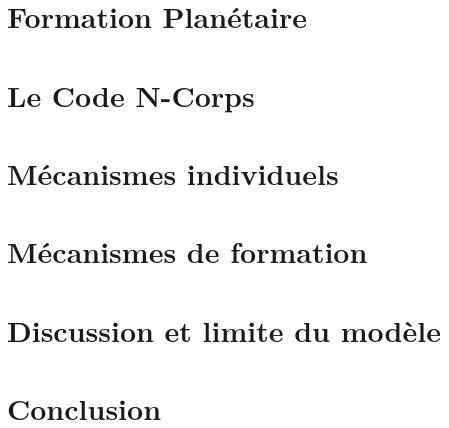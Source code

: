 \documentclass[logos,chaptertoc]{bordeaux-thesis}
\begin{document}






\chapter{Formation Planétaire}



\chapter{Le Code N-Corps}\label{sec:code_n-corps}



\chapter{Mécanismes individuels}



\chapter{Mécanismes de formation}



\chapter{Discussion et limite du modèle}\label{sec:discussion}



\chapter*{Conclusion}



\appendix




\end{document}
